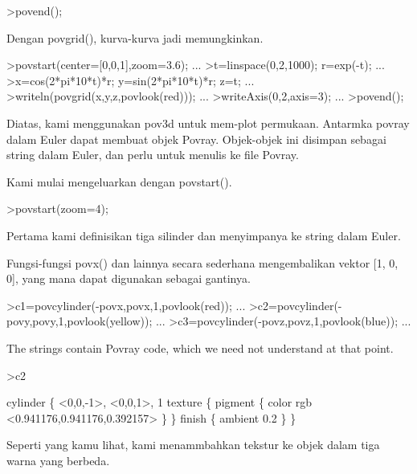 \documentclass[a4paper,10pt]{article}
\begin{document}
\begin{eulernotebook}
\begin{eulerprompt}
>povend();
\end{eulerprompt}
\begin{eulercomment}
Dengan povgrid(), kurva-kurva jadi memungkinkan.
\end{eulercomment}
\begin{eulerprompt}
>povstart(center=[0,0,1],zoom=3.6); ...
>t=linspace(0,2,1000); r=exp(-t); ...
>x=cos(2*pi*10*t)*r; y=sin(2*pi*10*t)*r; z=t; ...
>writeln(povgrid(x,y,z,povlook(red))); ...
>writeAxis(0,2,axis=3); ...
>povend();
\end{eulerprompt}
\begin{eulercomment}
Diatas, kami menggunakan pov3d untuk mem-plot permukaan. Antarmka
povray dalam Euler dapat membuat objek Povray. Objek-objek ini
disimpan sebagai string dalam Euler, dan perlu untuk menulis ke file
Povray.

Kami mulai mengeluarkan dengan povstart().
\end{eulercomment}
\begin{eulerprompt}
>povstart(zoom=4);
\end{eulerprompt}
\begin{eulercomment}
Pertama kami definisikan tiga silinder dan menyimpanya ke string dalam
Euler.

Fungsi-fungsi povx() dan lainnya secara sederhana mengembalikan vektor
[1, 0, 0], yang mana dapat digunakan sebagai gantinya.
\end{eulercomment}
\begin{eulerprompt}
>c1=povcylinder(-povx,povx,1,povlook(red)); ...
>c2=povcylinder(-povy,povy,1,povlook(yellow)); ...
>c3=povcylinder(-povz,povz,1,povlook(blue)); ...
\end{eulerprompt}
\begin{eulercomment}
The strings contain Povray code, which we need not understand at that
point.
\end{eulercomment}
\begin{eulerprompt}
>c2
\end{eulerprompt}
\begin{euleroutput}
  cylinder \{ <0,0,-1>, <0,0,1>, 1
   texture \{ pigment \{ color rgb <0.941176,0.941176,0.392157> \}  \} 
   finish \{ ambient 0.2 \} 
   \}
\end{euleroutput}
\begin{eulercomment}
Seperti yang kamu lihat, kami menammbahkan tekstur ke objek dalam tiga
warna yang berbeda.


\end{eulercomment}
\end{eulernotebook}
\end{document}
